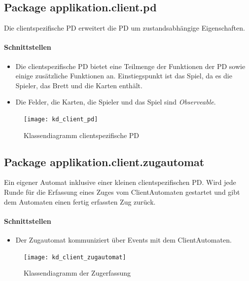 \documentclass[12pt,halfparskip]{scrartcl}
\begin{document}
	\subsection{Package applikation.client.pd}

		Die clientspezifische PD erweitert die PD um zustandsabhängige Eigenschaften.

		\paragraph{Schnittstellen}
		\begin{itemize}
			\item Die clientspezifische PD bietet eine Teilmenge der Funktionen der PD sowie einige zusätzliche Funktionen an. Einstiegspunkt ist das Spiel, da es die Spieler, das Brett und die Karten enthält.
			\item Die Felder, die Karten, die Spieler und das Spiel sind \emph{Observeable}.
		\end{itemize}

		\begin{figure}[H]
			\centering
			\texttt{[image: kd\_client\_pd]}
			\caption{Klassendiagramm clientspezifische PD}
			\label{fig:kd_client_pd}
		\end{figure}
		
	\subsection{Package applikation.client.zugautomat}

		Ein eigener Automat inklusive einer kleinen clientspezifischen PD. Wird jede Runde für die Erfassung eines Zuges vom ClientAutomaten gestartet und gibt dem Automaten einen fertig erfassten Zug zurück.

		\paragraph{Schnittstellen}
		\begin{itemize}
			\item Der Zugautomat kommuniziert über Events mit dem ClientAutomaten.
		\end{itemize}
		
		\begin{figure}[H]
			\centering
			\texttt{[image: kd\_client\_zugautomat]}
			\caption{Klassendiagramm der Zugerfassung}
			\label{fig:kd_client_zugautomat}
		\end{figure}
		
\end{document}
